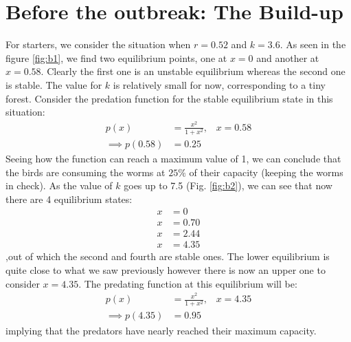 \documentclass{article}
\begin{document}
\section{Before the outbreak: The Build-up}
For starters, we consider the situation when $r=0.52$ and $k=3.6$. As seen in the figure \ref{fig:b1}, we find two equilibrium points, one at $x=0$ and another at $x=0.58$. Clearly the first one is an unstable equilibrium whereas the second one is stable. The value for $k$ is relatively small for now, corresponding to a tiny forest. Consider the predation function for the stable equilibrium state in this situation:
\begin{align}
    p(x) &= \frac{x^2}{1+x^2},\hspace{10pt} x=0.58\\
    \implies p(0.58) &= 0.25
\end{align}
Seeing how the function can reach a maximum value of 1, we can conclude that the birds are consuming the worms at $25\%$ of their capacity (keeping the worms in check).
As the value of $k$ goes up to 7.5 (Fig. \ref{fig:b2}), we can see that now there are 4 equilibrium states:
\begin{align*}
    x&=0\\
    x&=0.70\\
    x&=2.44\\
    x&=4.35
\end{align*}
,out of which the second and fourth are stable ones. The lower equilibrium is quite close to what we saw previously however there is now an upper one to consider $x=4.35$.
The predating function at this equilibrium will be:
\begin{align}
    p(x) &= \frac{x^2}{1+x^2},\hspace{10pt} x=4.35\\
    \implies p(4.35) &= 0.95
\end{align}
implying that the predators have nearly reached their maximum capacity.
\end{document}
